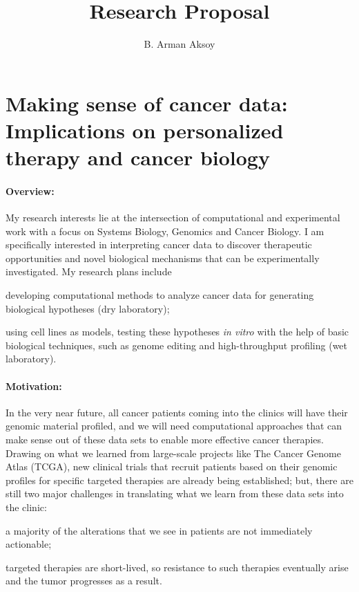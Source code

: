 \documentclass[11pt,letterpaper]{article}
\title{Research Proposal}
\author{B. Arman Aksoy}
\date{}
\begin{document}
\maketitle

\section*{Making sense of cancer data: Implications on personalized therapy and cancer biology}
\paragraph{Overview:}
My research interests lie at the intersection of computational and experimental work with a focus on Systems Biology, Genomics and Cancer Biology.
I am specifically interested in interpreting cancer data to discover therapeutic opportunities and novel biological mechanisms that can be experimentally investigated.
My research plans include
\begin{inparaenum}[(i)]
 \item developing computational methods to analyze cancer data for generating biological hypotheses (dry laboratory);
 \item using cell lines as models, testing these hypotheses \textit{in vitro} with the help of basic biological techniques, such as genome editing and high-throughput profiling (wet laboratory).
\end{inparaenum}

\paragraph{Motivation:}
In the very near future, all cancer patients coming into the clinics will have their genomic material profiled,
and we will need computational approaches that can make sense out of these data sets to enable more effective cancer therapies.
Drawing on what we learned from large-scale projects like The Cancer Genome Atlas (TCGA), 
new clinical trials that recruit patients based on their genomic profiles for specific targeted therapies are already being established;
but, there are still two major challenges in translating what we learn from these data sets into the clinic:
\begin{inparaenum}[(i)]
 \item a majority of the alterations that we see in patients are not immediately actionable;
 \item targeted therapies are short-lived, so resistance to such therapies eventually arise and the tumor progresses as a result.
\end{inparaenum}
\end{document}
